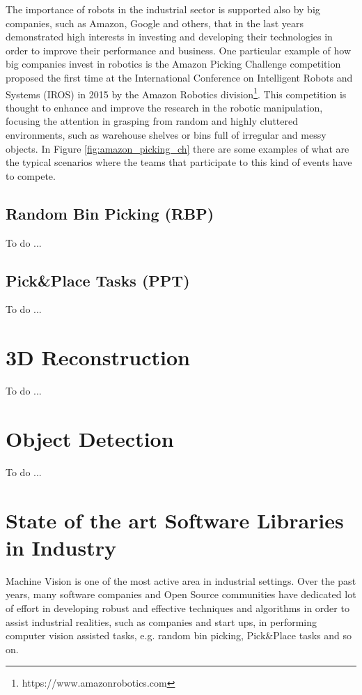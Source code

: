 The importance of robots in the industrial sector is supported also by big companies, such as Amazon, Google and others, that in the last years demonstrated high interests in investing and developing their technologies in order to improve their performance and business. One particular example of how big companies invest in robotics is the Amazon Picking Challenge competition proposed the first time at the International Conference on Intelligent Robots and Systems (IROS) in 2015 by the Amazon Robotics division\footnote{https://www.amazonrobotics.com}. This competition is thought to enhance and improve the research in the robotic manipulation, focusing the attention in grasping from random and highly cluttered environments, such as warehouse shelves or bins full of irregular and messy objects. In Figure \ref{fig:amazon_picking_ch} there are some examples of what are the typical scenarios where the teams that participate to this kind of events have to compete.

\subsection{Random Bin Picking (RBP)}\label{subsec:binpicking}
To do ...

\subsection{Pick\&Place Tasks (PPT)}\label{subsec:pickandplace}
To do ...

\section{3D Reconstruction}\label{sec:3dreconstruction}
To do ...

\section{Object Detection}\label{sec:objectdetection}
To do ...

\section{State of the art Software Libraries in Industry}\label{sec:industrylibraries}
Machine Vision is one of the most active area in industrial settings. Over the past years, many software companies and Open Source communities have dedicated lot of effort in developing robust and effective techniques and algorithms in order to assist industrial realities, such as companies and start ups, in performing computer vision assisted tasks, e.g. random bin picking, Pick\&Place tasks and so on.

